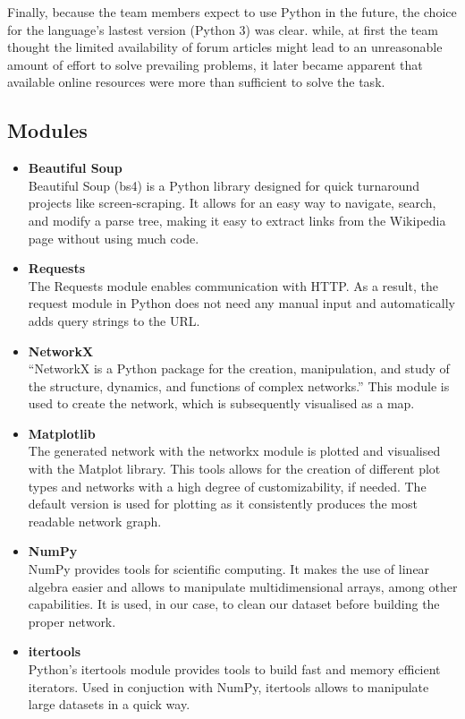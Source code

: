 \documentclass[10pt]{article}
\begin{document}
\noindent Finally, because the team members expect to use Python in the future, the choice for the language's lastest version (Python 3) was clear. while, at first the team thought the limited availability of forum articles might lead to an unreasonable amount of effort to solve prevailing problems, it later became apparent that available online resources were more than sufficient to solve the task. 




\subsection{Modules}

 \begin{itemize}    %
        \item\textbf{Beautiful Soup}\\
	Beautiful Soup (bs4) is a Python library designed for quick turnaround projects like screen-scraping. It allows for an easy way to navigate, search, and modify a parse tree, making it easy to extract links from the Wikipedia page without using much code. \cite{cru} 
 
        \item \textbf{Requests}\\
 	The Requests module enables communication with HTTP. As a result, the request module in Python does not need any manual input and automatically adds query strings to the  	
	URL.   \cite{req}
	
        \item \textbf{NetworkX}\\
	``NetworkX is a Python package for the creation, manipulation, and study of the structure, dynamics, and functions of complex networks.'' \cite{net} This module is used to create 
	the network, which is subsequently visualised as a map. 
	
        \item \textbf{Matplotlib}\\
        The generated network with the networkx module is plotted and visualised with the Matplot library. This tools allows for the creation of different plot types and networks with a high 	
        degree of customizability, if needed. The default version is used for plotting as it consistently produces the most readable network graph. 
        
        \item \textbf{NumPy}\\
	NumPy provides tools for scientific computing. It makes the use of linear algebra easier and allows to manipulate multidimensional arrays, among other capabilities. It is used, in our case, to clean our dataset before building the proper network.

        \item \textbf{itertools}\\
	Python's itertools module provides tools to build fast and memory efficient iterators. Used in conjuction with NumPy, itertools allows to manipulate large datasets in a quick way.
        
        
    \end{itemize}
 
\end{document}
